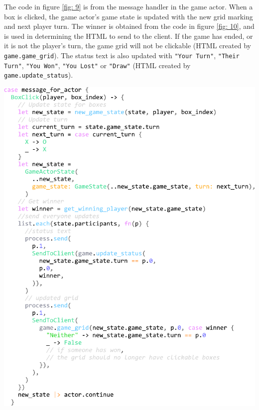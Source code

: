 \documentclass[]{final}
\begin{document}
\begin{minipage}[t]{18em}

  The code in figure \ref{fig: 9} is from the message handler in the game actor.
  When a box is clicked, the game actor's game state is updated with the new
  grid marking and next player turn. The winner is obtained from the code in
  figure \ref{fig: 10}, and is used in determining the HTML to send to the client.
  If the game has ended, or it is not the player's turn, the game grid will not be
  clickable (HTML created by \lstinline|game.game_grid|). The status text is also
  updated with \lstinline|"Your Turn"|, \lstinline|"Their Turn"|, \lstinline|"You Won"|,
  \lstinline|"You Lost"| or \lstinline|"Draw"| (HTML created by \lstinline|game.update_status|).

\end{minipage}
\hfill
\begin{minipage}[t]{20em}
  \includegraphics[width=\textwidth]{box_click.pdf}
  \label{fig: 9}
\end{minipage}
\end{document}
